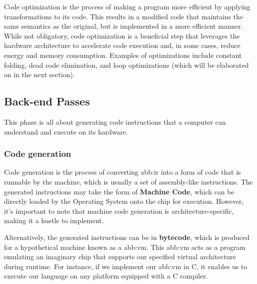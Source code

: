             Code optimization is the process of making a program more efficient by applying transformations to its code. This results in a modified code that maintains the same semantics as the original, but is implemented in a more efficient manner. While not obligatory,  code optimization is a beneficial step that leverages the hardware architecture to accelerate code execution and, in some cases, reduce energy and memory consumption. Examples of optimizations include constant folding, dead code elimination, and loop optimizations (which will be elaborated on in the next section).

    \subsection{Back-end Passes}
        This phase is all about generating code instructions that a computer can understand and execute on its hardware.

        \subsubsection{Code generation}
            Code generation is the process of converting \gls{abb:ir} into a form of code that is runnable by the machine, which is usually a set of assembly-like instructions. The generated instructions may take the form of \textbf{Machine Code}, which can be directly loaded by the Operating System onto the chip for execution. However, it's important to note that machine code generation is architecture-specific, making it a hustle to implement.

            Alternatively, the generated instructions can be in \textbf{bytecode}, which is produced for a hypothetical machine known as a \gls{abb:vm}. This \gls{abb:vm} acts as a program emulating an imaginary chip that supports our specified virtual architecture during runtime. For instance, if we implement our \gls{abb:vm} in C, it enables us to execute our language on any platform equipped with a C compiler.
